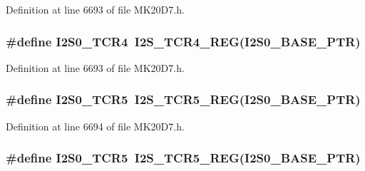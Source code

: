 Definition at line 6693 of file M\+K20\+D7.\+h.

\subsubsection[{\texorpdfstring{I2\+S0\+\_\+\+T\+C\+R4}{I2S0_TCR4}}]{\setlength{\rightskip}{0pt plus 5cm}\#define I2\+S0\+\_\+\+T\+C\+R4~{\bf I2\+S\+\_\+\+T\+C\+R4\+\_\+\+R\+EG}({\bf I2\+S0\+\_\+\+B\+A\+S\+E\+\_\+\+P\+TR})}\hypertarget{group___i2_s___register___accessor___macros_gaa4db90a1523128f0d06710664466359a}{}\label{group___i2_s___register___accessor___macros_gaa4db90a1523128f0d06710664466359a}


Definition at line 6693 of file M\+K20\+D7.\+h.

\subsubsection[{\texorpdfstring{I2\+S0\+\_\+\+T\+C\+R5}{I2S0_TCR5}}]{\setlength{\rightskip}{0pt plus 5cm}\#define I2\+S0\+\_\+\+T\+C\+R5~{\bf I2\+S\+\_\+\+T\+C\+R5\+\_\+\+R\+EG}({\bf I2\+S0\+\_\+\+B\+A\+S\+E\+\_\+\+P\+TR})}\hypertarget{group___i2_s___register___accessor___macros_ga8f07439ed2fea3dcfad6e145e1b7c8ec}{}\label{group___i2_s___register___accessor___macros_ga8f07439ed2fea3dcfad6e145e1b7c8ec}


Definition at line 6694 of file M\+K20\+D7.\+h.

\subsubsection[{\texorpdfstring{I2\+S0\+\_\+\+T\+C\+R5}{I2S0_TCR5}}]{\setlength{\rightskip}{0pt plus 5cm}\#define I2\+S0\+\_\+\+T\+C\+R5~{\bf I2\+S\+\_\+\+T\+C\+R5\+\_\+\+R\+EG}({\bf I2\+S0\+\_\+\+B\+A\+S\+E\+\_\+\+P\+TR})}\hypertarget{group___i2_s___register___accessor___macros_ga8f07439ed2fea3dcfad6e145e1b7c8ec}{}\label{group___i2_s___register___accessor___macros_ga8f07439ed2fea3dcfad6e145e1b7c8ec}


